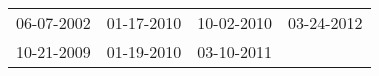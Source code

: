 \begin{supertabular}{llll}
 06-07-2002 &  01-17-2010 &  10-02-2010 &  03-24-2012 \\
 10-21-2009 &  01-19-2010 &  03-10-2011 &             \\
\end{supertabular}
